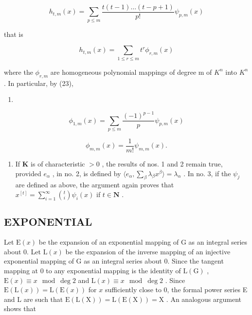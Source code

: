 \[
h _ {t, m} (x) = \sum_ {p \leqslant m} \frac {t (t - 1) \dots (t - p + 1)}{p !} \psi_ {p, m} (x)\tag{23}
\]

that is

\[
h _ {t, m} (x) = \sum_ {1 \leqslant r \leqslant m} t ^ {r} \phi_ {r, m} (x)\tag{24}
\]

where the \(\phi_{r,m}\) are homogeneous polynomial mappings of degree m of \(K^{n}\) into \(K^{n}\) . In particular, by (23),

\begin{enumerate}
\def\labelenumi{(\arabic{enumi})}
\setcounter{enumi}{24}
\tightlist
\item
\end{enumerate}

\[
\phi_ {1, m} (x) = \sum_ {p \leqslant m} \frac {(- 1) ^ {p - 1}}{p} \psi_ {p, m} (x)\tag{25}
\]

\[
\phi_ {m, m} (x) = \frac {1}{m !} \psi_ {m, m} (x).\tag{26}
\]

\begin{enumerate}
\def\labelenumi{(\arabic{enumi})}
\setcounter{enumi}{4}
\tightlist
\item
  If \(\mathbf{K}\) is of characteristic \(>0\) , the results of nos. 1 and 2 remain true, provided \(e_{\alpha}\) , in no. 2, is defined by \(\langle e_{\alpha}, \sum_{\beta} \lambda_{\beta} x^{\beta} \rangle = \lambda_{\alpha}\) . In no. 3, if the \(\psi_j\) are defined as above, the argument again proves that \(x^{[t]} = \sum_{i=1}^{\infty} \binom{t}{i} \psi_i(x)\) if \(t \in \mathbf{N}\) .
\end{enumerate}

\subsection{EXPONENTIAL}

Let \(\mathrm{E}(x)\) be the expansion of an exponential mapping of G as an integral series about 0. Let \(\mathrm{L}(x)\) be the expansion of the inverse mapping of an injective exponential mapping of G as an integral series about 0. Since the tangent mapping at 0 to any exponential mapping is the identity of \(\mathrm{L}(\mathrm{G})\) , \(\mathrm{E}(x) \equiv x \mod \deg 2\) and \(\mathrm{L}(x) \equiv x \mod \deg 2\) . Since \(\mathrm{E}(\mathrm{L}(x)) = \mathrm{L}(\mathrm{E}(x))\) for \(x\) sufficiently close to 0, the formal power series E and L are such that \(\mathrm{E}(\mathrm{L}(\mathrm{X})) = \mathrm{L}(\mathrm{E}(\mathrm{X})) = \mathrm{X}\) . An analogous argument shows that

